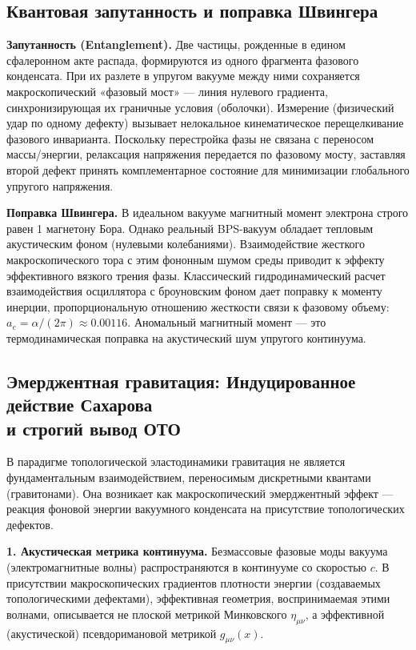 \documentclass[11pt,a4paper]{article}
\begin{document}
	\subsection{Квантовая запутанность и поправка Швингера}
	\textbf{Запутанность (Entanglement).} Две частицы, рожденные в едином сфалеронном акте распада, формируются из одного фрагмента фазового конденсата. При их разлете в упругом вакууме между ними сохраняется макроскопический «фазовый мост» — линия нулевого градиента, синхронизирующая их граничные условия (оболочки). Измерение (физический удар по одному дефекту) вызывает нелокальное кинематическое перещелкивание фазового инварианта. Поскольку перестройка фазы не связана с переносом массы/энергии, релаксация напряжения передается по фазовому мосту, заставляя второй дефект принять комплементарное состояние для минимизации глобального упругого напряжения.
	
	\textbf{Поправка Швингера.} В идеальном вакууме магнитный момент электрона строго равен 1 магнетону Бора. Однако реальный BPS-вакуум обладает тепловым акустическим фоном (нулевыми колебаниями). Взаимодействие жесткого макроскопического тора с этим фононным шумом среды приводит к эффекту эффективного вязкого трения фазы. Классический гидродинамический расчет взаимодействия осциллятора с броуновским фоном дает поправку к моменту инерции, пропорциональную отношению жесткости связи к фазовому объему: $a_e = \alpha / (2\pi) \approx 0.00116$. Аномальный магнитный момент — это термодинамическая поправка на акустический шум упругого континуума.
	
	\subsection{Эмерджентная гравитация: Индуцированное действие Сахарова\\ и строгий вывод ОТО}
	В парадигме топологической эластодинамики гравитация не является фундаментальным взаимодействием, переносимым дискретными квантами (гравитонами). Она возникает как макроскопический эмерджентный эффект — реакция фоновой энергии вакуумного конденсата на присутствие топологических дефектов.
	
	\textbf{1. Акустическая метрика континуума.}
	Безмассовые фазовые моды вакуума (электромагнитные волны) распространяются в континууме со скоростью $c$. В присутствии макроскопических градиентов плотности энергии (создаваемых топологическими дефектами), эффективная геометрия, воспринимаемая этими волнами, описывается не плоской метрикой Минковского $\eta_{\mu\nu}$, а эффективной (акустической) псевдоримановой метрикой $g_{\mu\nu}(x)$. 
	
\end{document}
